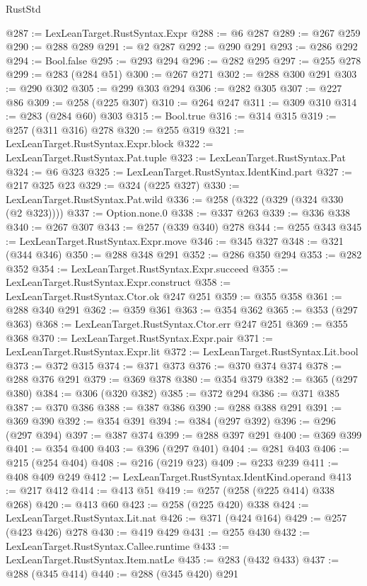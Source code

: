 \begin{lexlean}{RustStd}
\begin{coremodule}
@287 := LexLeanTarget.RustSyntax.Expr
@288 := @6 @287
@289 := @267 @259
@290 := @288 @289
@291 := @2 @287
@292 := @290 @291
@293 := @286 @292
@294 := Bool.false
@295 := @293 @294
@296 := @282 @295
@297 := @255 @278
@299 := @283 (@284 @51)
@300 := @267 @271
@302 := @288 @300 @291
@303 := @290 @302
@305 := @299 @303 @294
@306 := @282 @305
@307 := @227 @86
@309 := @258 (@225 @307)
@310 := @264 @247
@311 := @309 @310
@314 := @283 (@284 @60) @303
@315 := Bool.true
@316 := @314 @315
@319 := @257 (@311 @316) @278
@320 := @255 @319
@321 := LexLeanTarget.RustSyntax.Expr.block
@322 := LexLeanTarget.RustSyntax.Pat.tuple
@323 := LexLeanTarget.RustSyntax.Pat
@324 := @6 @323
@325 := LexLeanTarget.RustSyntax.IdentKind.part
@327 := @217 @325 @23
@329 := @324 (@225 @327)
@330 := LexLeanTarget.RustSyntax.Pat.wild
@336 := @258 (@322 (@329 (@324 @330 (@2 @323))))
@337 := Option.none.{0}
@338 := @337 @263
@339 := @336 @338
@340 := @267 @307
@343 := @257 (@339 @340) @278
@344 := @255 @343
@345 := LexLeanTarget.RustSyntax.Expr.move
@346 := @345 @327
@348 := @321 (@344 @346)
@350 := @288 @348 @291
@352 := @286 @350 @294
@353 := @282 @352
@354 := LexLeanTarget.RustSyntax.Expr.succeed
@355 := LexLeanTarget.RustSyntax.Expr.construct
@358 := LexLeanTarget.RustSyntax.Ctor.ok @247 @251
@359 := @355 @358
@361 := @288 @340 @291
@362 := @359 @361
@363 := @354 @362
@365 := @353 (@297 @363)
@368 := LexLeanTarget.RustSyntax.Ctor.err @247 @251
@369 := @355 @368
@370 := LexLeanTarget.RustSyntax.Expr.pair
@371 := LexLeanTarget.RustSyntax.Expr.lit
@372 := LexLeanTarget.RustSyntax.Lit.bool
@373 := @372 @315
@374 := @371 @373
@376 := @370 @374 @374
@378 := @288 @376 @291
@379 := @369 @378
@380 := @354 @379
@382 := @365 (@297 @380)
@384 := @306 (@320 @382)
@385 := @372 @294
@386 := @371 @385
@387 := @370 @386
@388 := @387 @386
@390 := @288 @388 @291
@391 := @369 @390
@392 := @354 @391
@394 := @384 (@297 @392)
@396 := @296 (@297 @394)
@397 := @387 @374
@399 := @288 @397 @291
@400 := @369 @399
@401 := @354 @400
@403 := @396 (@297 @401)
@404 := @281 @403
@406 := @215 (@254 @404)
@408 := @216 (@219 @23)
@409 := @233 @239
@411 := @408 @409 @249
@412 := LexLeanTarget.RustSyntax.IdentKind.operand
@413 := @217 @412
@414 := @413 @51
@419 := @257 (@258 (@225 @414) @338 @268)
@420 := @413 @60
@423 := @258 (@225 @420) @338
@424 := LexLeanTarget.RustSyntax.Lit.nat
@426 := @371 (@424 @164)
@429 := @257 (@423 @426) @278
@430 := @419 @429
@431 := @255 @430
@432 := LexLeanTarget.RustSyntax.Callee.runtime
@433 := LexLeanTarget.RustSyntax.Item.natLe
@435 := @283 (@432 @433)
@437 := @288 (@345 @414)
@440 := @288 (@345 @420) @291

\end{coremodule}
\end{lexlean}
